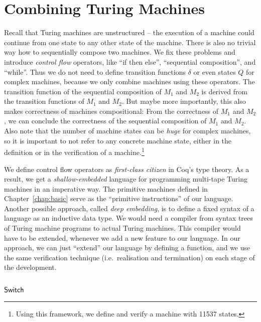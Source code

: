 \chapter{Combining Turing Machines}
\label{chap:combining}

Recall that Turing machines are unstructured -- the execution of a machine could continue from one state to any other state of the machine.  There is
also no trivial way how to sequentially compose two machines.  We fix these problems and introduce \textit{control flow} operators, like ``if then
else'', ``sequential composition'', and ``while''.  Thus we do not need to define transition functions $\delta$ or even states $Q$ for complex
machines, because we only combine machines using these operators.  The transition function of the sequential composition of $M_1$ and $M_2$ is derived
from the transition functions of $M_1$ and $M_2$.  But maybe more importantly, this also makes correctness of machines compositional: From the
correctness of $M_1$ and $M_2$, we can conclude the correctness of the sequential composition of $M_1$ and $M_2$.  Also note that the number of
machine states can be \textit{huge} for complex machines, so it is important to not refer to any concrete machine state, either in the definition or
in the verification of a machine.\footnote{Using this framework, we define and verify a machine with 11537 states.}

We define control flow operators as \textit{first-class citizen} in Coq's type theory.  As a result, we get a \textit{shallow-embedded} language for
programming multi-tape Turing machines in an imperative way.  The primitive machines defined in Chapter~\ref{chap:basic} serve as the ``primitive
instructions'' of our language.  Another possible approach, called \textit{deep embedding}, is to define a fixed syntax of a language as an inductive
data type.  We would need a compiler from syntax trees of Turing machine programs to actual Turing machines.  This compiler would have to be extended,
whenever we add a new feature to our language.  In our approach, we can just ``extend'' our language by defining a function, and we use the same
verification technique (i.e.\ realisation and termination) on each stage of the development.


\section{$\mathsf{Switch}$}
\label{sec:switch}


